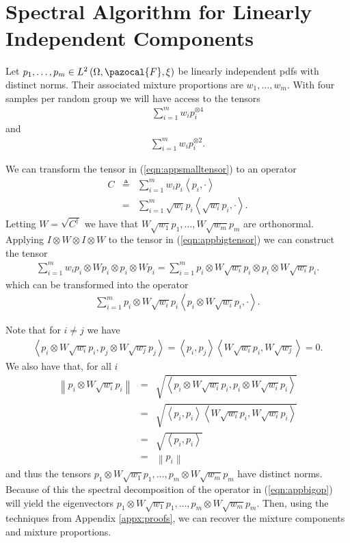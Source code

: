 \documentclass[aos,preprint]{imsart}
\def\l{\left}
\def\r{\right}
\def\sF{\pazocal{F}}
\theoremstyle{plain}
\theoremstyle{defintion}
\begin{document}
	\section{Spectral Algorithm for Linearly Independent Components}\label{appx:spectral}
	Let $p_1,\ldots, p_m \in L^{2}\left( \Omega,\sF, \xi \right)$ be linearly independent pdfs with distinct norms. Their associated mixture proportions are $w_1,\ldots,w_m$. With four samples per random group we will have access to the tensors
	\begin{eqnarray}\label{eqn:appbigtensor}
		\sum_{i=1}^m w_i p_i^{\otimes 4}
	\end{eqnarray}
	and
	\begin{eqnarray} \label{eqn:appsmalltensor}
		\sum_{i=1}^m w_i p_i^{\otimes 2}.
	\end{eqnarray}

	We can transform the tensor in (\ref{eqn:appsmalltensor}) to an operator
	\begin{eqnarray*}
		C &\triangleq&  \sum_{i=1}^m w_i p_i\l<p_i,\cdot\r>\\
    &=& \sum_{i=1}^m \sqrt{w_i} p_i\l<\sqrt{w_i}p_i,\cdot\r>.
	\end{eqnarray*}
	Letting $W = \sqrt{C^\dagger}$ we have that $W \sqrt{w_1} p_1,\ldots,W \sqrt{w_m} p_m$ are orthonormal. Applying $I\otimes W \otimes I \otimes W$ to the tensor in (\ref{eqn:appbigtensor}) we can construct the tensor
	\begin{eqnarray*}
		\sum_{i=1}^m w_i p_i \otimes Wp_i \otimes p_i \otimes Wp_i = \sum_{i=1}^m  p_i \otimes W\sqrt{w_i}p_i \otimes p_i \otimes W\sqrt{w_i}p_i.
	\end{eqnarray*}
	which can be transformed into the operator
	\begin{eqnarray} \label{eqn:appbigop}
		\sum_{i=1}^m  p_i \otimes W\sqrt{w_i}p_i \l< p_i \otimes W\sqrt{w_i}p_i,\cdot\r>.
	\end{eqnarray}

	Note that for $i\neq j$ we have
	\begin{eqnarray*}
		\l<p_i\otimes W \sqrt{w_i}p_i,p_j\otimes W \sqrt{w_j}p_j\r> = \l<p_i,p_j\r> \l<W \sqrt{w_i} p_i, W \sqrt{w_j}\r> = 0.
	\end{eqnarray*}
	We also have that, for all $i$
	\begin{eqnarray*}
		\l\|p_i\otimes W\sqrt{w_i} p_i\r\|
		&=& \sqrt{\l<p_i\otimes W\sqrt{w_i} p_i,p_i\otimes W\sqrt{w_i} p_i\r>}\\
  &=& \sqrt{\l<p_i , p_i\r>\l<W\sqrt{w_i}p_i, W\sqrt{w_i}p_i\r>}\\
  &=& \sqrt{\l<p_i , p_i\r>}\\
  &=& \l\|p_i\r\|
	\end{eqnarray*}
	and thus the tensors $p_1\otimes W\sqrt{w_1}p_1, \ldots,p_m\otimes W\sqrt{w_m}p_m$ have distinct norms. Because of this the spectral decomposition of the operator in (\ref{eqn:appbigop}) will yield the eigenvectors $p_1 \otimes W\sqrt{w_1}p_1, \ldots,p_m \otimes W\sqrt{w_m}p_m$. Then, using the techniques from Appendix \ref{appx:proofs}, we can recover the mixture components and mixture proportions.
	
	

	
\end{document}
